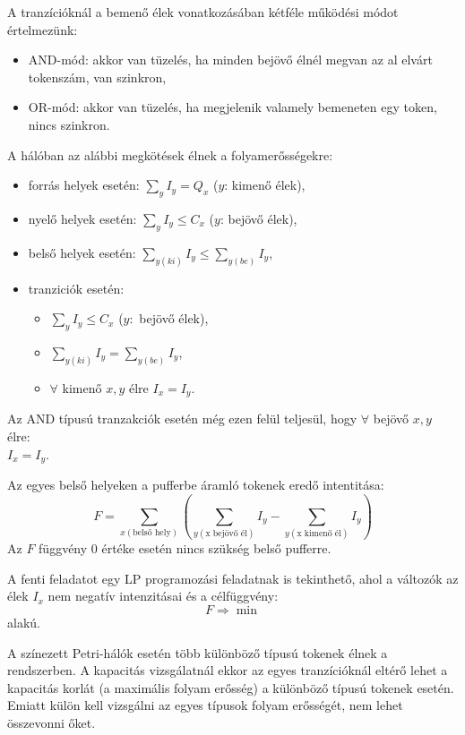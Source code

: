 A tranzícióknál a bemenő élek vonatkozásában kétféle működési módot értelmezünk:
\begin{itemize}
\item AND-mód: akkor van tüzelés, ha minden bejövő élnél megvan az al elvárt tokenszám, van szinkron,
\item OR-mód: akkor van tüzelés, ha megjelenik valamely bemeneten egy token, nincs szinkron.
\end{itemize}
A hálóban az alábbi megkötések élnek a folyamerősségekre:
\begin{itemize}
\item forrás helyek esetén: $\sum_y I_y=Q_x$ ($y$: kimenő élek),
\item nyelő helyek esetén: $\sum_y I_y \leq C_x$ ($y$: bejövő élek),
\item belső helyek esetén: 
$\sum_{y(ki)} I_y\leq \sum_{y(be)} I_y$,
\item tranziciók esetén: 
\begin{itemize}
\item $\sum_y I_y\leq C_x$ ($y:$ bejövő élek),
\item $\sum_{y(ki)} I_y = \sum_{y(be)} I_y$,
\item $\forall$ kimenő $x,y$ élre $I_x=I_y$.
\end{itemize}
\end{itemize}
Az AND típusú tranzakciók esetén még ezen felül teljesül, hogy $\forall$ bejövő $x,y$ élre:\\
$I_x = I_y$.

Az egyes belső helyeken a pufferbe áramló tokenek  eredő intentitása:
$$F= \sum_{x(\text{belső hely})} \left( \sum_{y(\text{x bejövő él})} I_y - \sum_{y(\text{x kimenő él})} I_y \right)$$
Az $F$ függvény 0 értéke esetén nincs szükség belső pufferre.

A fenti feladatot egy LP programozási feladatnak is tekinthető, ahol a változók az élek $I_x$ nem negatív intenzitásai és a célfüggvény:
$$F\Rightarrow \min$$ alakú.


A színezett Petri-hálók esetén több különböző típusú tokenek élnek a rendszerben. A kapacitás vizsgálatnál ekkor az egyes tranzícióknál eltérő lehet a kapacitás korlát (a maximális folyam erősség) a különböző típusú tokenek esetén. Emiatt külön kell vizsgálni az egyes típusok folyam erősségét, nem lehet összevonni őket.

